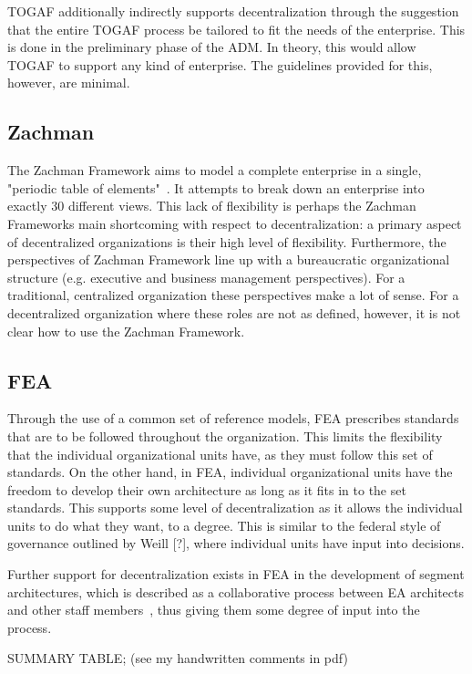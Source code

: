 
TOGAF additionally indirectly supports decentralization through the suggestion that the entire TOGAF process be tailored to fit the needs of the enterprise. This is done in the preliminary phase of the ADM. In theory, this would allow TOGAF to support any kind of enterprise. The guidelines provided for this, however, are minimal. 


\subsection{Zachman}
The Zachman Framework aims to model a complete enterprise in a single, "periodic table of elements"~\cite{Bente2012}. It attempts to break down an enterprise into exactly 30 different views. This lack of flexibility is perhaps the Zachman Frameworks main shortcoming with respect to decentralization: a primary aspect of decentralized organizations is their high level of flexibility. Furthermore, the perspectives of Zachman Framework line up with a bureaucratic organizational structure (e.g. executive and business management perspectives). For a traditional, centralized organization these perspectives make a lot of sense. For a decentralized organization where these roles are not as defined, however, it is not clear how to use the Zachman Framework. 

\subsection{FEA}

Through the use of a common set of reference models, FEA prescribes standards that are to be followed throughout the organization. This limits the flexibility that the individual organizational units have, as they must follow this set of standards. On the other hand, in FEA, individual organizational units have the freedom to develop their own architecture as long as it fits in to the set standards. This supports some level of decentralization as it allows the individual units to do what they want, to a degree. This is similar to the federal style of governance outlined by Weill [?], where individual units have input into decisions. 

Further support for decentralization exists in FEA in the development of segment architectures, which is described as a collaborative process between EA architects and other staff members~\cite{FederalEnterpriseArchitectureProgramManagementOffice2007}, thus giving them some degree of input into the process. 

SUMMARY TABLE;
(see my handwritten comments in pdf)
